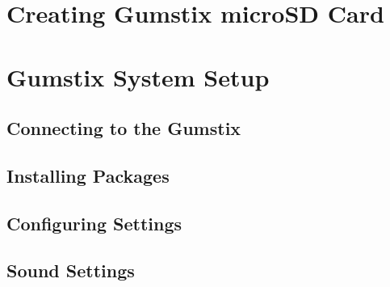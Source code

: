 \section{Creating Gumstix microSD Card}



\section{Gumstix System Setup}

\subsection{Connecting to the Gumstix}

\subsection{Installing Packages}



\subsection{Configuring Settings}



\subsection{Sound Settings}

